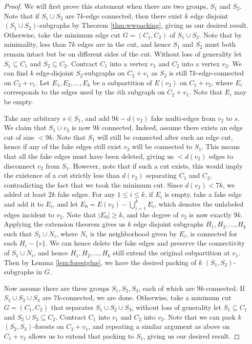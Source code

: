 \documentclass{article}
\begin{document}
\begin{proof}
    We will first prove this statement when there are two groups, $S_1$ and $S_2$. Note that if $S_1 \cup S_2$ are $7k$-edge connected, then there exist $k$ edge disjoint $(S_1 \cup S_2)$-subgraphs by Theorem \ref{thm:wwpacking}, giving us our desired result. Otherwise, take the minimum edge cut $G=(C_1,C_2)$ of $S_1 \cup S_2$. Note that by minimality, less than $7k$ edges are in the cut, and hence $S_1$ and $S_2$ must both remain intact but be on different sides of the cut. Without loss of generality let $S_1 \subseteq C_1$ and $S_2 \subseteq C_2$. Contract $C_1$ into a vertex $v_1$ and $C_2$ into a vertex $v_2$. We can find $k$ edge-disjoint $S_2$-subgraphs on $C_2+v_1$ as $S_2$ is still $7k$-edge-connected on $C_2+v_1$. Let $E_1,E_2,...,E_k$ be a subpartition of $E(v_2)$ on $C_1+v_2$, where $E_i$ corresponds to the edges used by the $i$th subgraph on $C_2+v_1$. Note that $E_i$ may be empty. 

    Take any arbitrary $s \in S_1$, and add $9k-d(v_2)$ fake multi-edges from $v_2$ to $s$. We claim that $S_1 \cup v_2$ is now $9k$ connected. Indeed, assume there exists an edge cut of size $< 9k$. Note that $S_1$ will still be connected after such an edge cut, hence if any of the fake edges still exist $v_2$ will be connected to $S_1$. This means that all the fake edges must have been deleted, giving us $< d(v_2)$ edges to disconnect $v_2$ from $S_1$. However, note that if such a cut exists, this would imply the existence of a cut strictly less than $d(v_2)$ separating $C_1$ and $C_2$, contradicting the fact that we took the minimum cut. Since $d(v_2) < 7k$, we added at least $2k$ fake edges. For any $1 \leq i \leq k$, if $E_i$ is empty, take a fake edge and add it to $E_i$, and let $E_0 = E(v_2) - \bigcup_{i=1}^k E_i$, which denotes the unlabeled edges incident to $v_2$. Note that $|E_0| \geq k$, and the degree of $v_2$ is now exactly $9k$. Applying the extension theorem gives us $k$ edge disjoint subgraphs $H_1,H_2,...,H_k$ such that $S_1 \cup N_i$, where $N_i$ is the neighborhood given by $E_i$, is connected for each $H_i-\{v\}$. We can hence delete the fake edges and preserve the connectivity of $S_1 \cup N_i$, and hence $H_1,H_2,...,H_k$ still extend the original subpartition at $v_1$. Then by Lemma \ref{lem:forestglue}, we have the desired packing of $k$ $(S_1,S_2)$-subgraphs in $G$.

    Now assume there are three groups $S_1,S_2,S_3$, each of which are $9k$-connected. If $S_1 \cup S_2 \cup S_3$ are $7k$-connected, we are done. Otherwise, take a minimum cut $G=(C_1,C_2)$ that separates $S_1 \cup S_2 \cup S_3$, without loss of generality let $S_1 \subseteq C_1$ and $S_2 \cup S_3 \subseteq C_2$. Contract $C_1$ into $v_1$ and $C_2$ into $v_2$. Note that we can pack $k$ $(S_2,S_3)$-forests on $C_2+v_1$, and repeating a similar argument as above on $C_1+v_2$ allows us to extend that packing to $S_1$, giving us our desired result. 

\end{proof}
\end{document}
